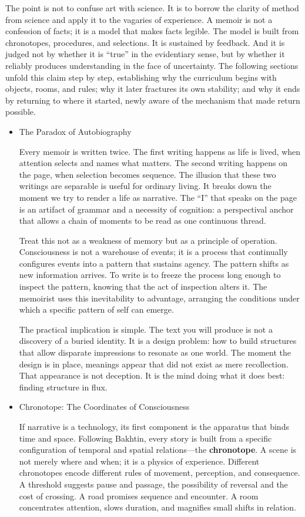 \documentclass[11pt]{article}
\begin{document}
The point is not to confuse art with science. It is to borrow the clarity of method from science and apply it to the vagaries of experience. A memoir is not a confession of facts; it is a model that makes facts legible. The model is built from chronotopes, procedures, and selections. It is sustained by feedback. And it is judged not by whether it is “true” in the evidentiary sense, but by whether it reliably produces understanding in the face of uncertainty. The following sections unfold this claim step by step, establishing why the curriculum begins with objects, rooms, and rules; why it later fractures its own stability; and why it ends by returning to where it started, newly aware of the mechanism that made return possible.
\begin{itemize}
\item The Paradox of Autobiography
\label{sec:org8b7a4f0}

Every memoir is written twice. The first writing happens as life is lived, when attention selects and names what matters. The second writing happens on the page, when selection becomes sequence. The illusion that these two writings are separable is useful for ordinary living. It breaks down the moment we try to render a life as narrative. The “I” that speaks on the page is an artifact of grammar and a necessity of cognition: a perspectival anchor that allows a chain of moments to be read as one continuous thread.

Treat this not as a weakness of memory but as a principle of operation. Consciousness is not a warehouse of events; it is a process that continually configures events into a pattern that sustains agency. The pattern shifts as new information arrives. To write is to freeze the process long enough to inspect the pattern, knowing that the act of inspection alters it. The memoirist uses this inevitability to advantage, arranging the conditions under which a specific pattern of self can emerge.

The practical implication is simple. The text you will produce is not a discovery of a buried identity. It is a design problem: how to build structures that allow disparate impressions to resonate as one world. The moment the design is in place, meanings appear that did not exist as mere recollection. That appearance is not deception. It is the mind doing what it does best: finding structure in flux.
\item Chronotope: The Coordinates of Consciousness
\label{sec:org2fa89f0}

If narrative is a technology, its first component is the apparatus that binds time and space. Following Bakhtin, every story is built from a specific configuration of temporal and spatial relations—the \textbf{chronotope}. A scene is not merely where and when; it is a physics of experience. Different chronotopes encode different rules of movement, perception, and consequence. A threshold suggests pause and passage, the possibility of reversal and the cost of crossing. A road promises sequence and encounter. A room concentrates attention, slows duration, and magnifies small shifts in relation.


\end{itemize}
\end{document}
